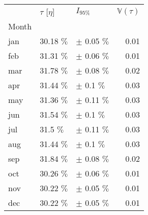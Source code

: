\begin{tabular}{lllr}
\toprule
{} & $\tau$ [$\eta$] &       $I_{95\%}$ &  $\mathbb{V}(\tau)$ \\
Month &                 &                  &                     \\
\midrule
jan   &      30.18 $\%$ &  $\pm$ 0.05 $\%$ &                0.01 \\
feb   &      31.31 $\%$ &  $\pm$ 0.06 $\%$ &                0.01 \\
mar   &      31.78 $\%$ &  $\pm$ 0.08 $\%$ &                0.02 \\
apr   &      31.44 $\%$ &   $\pm$ 0.1 $\%$ &                0.03 \\
may   &      31.36 $\%$ &  $\pm$ 0.11 $\%$ &                0.03 \\
jun   &      31.54 $\%$ &   $\pm$ 0.1 $\%$ &                0.03 \\
jul   &       31.5 $\%$ &  $\pm$ 0.11 $\%$ &                0.03 \\
aug   &      31.44 $\%$ &   $\pm$ 0.1 $\%$ &                0.03 \\
sep   &      31.84 $\%$ &  $\pm$ 0.08 $\%$ &                0.02 \\
oct   &      30.26 $\%$ &  $\pm$ 0.06 $\%$ &                0.01 \\
nov   &      30.22 $\%$ &  $\pm$ 0.05 $\%$ &                0.01 \\
dec   &      30.22 $\%$ &  $\pm$ 0.05 $\%$ &                0.01 \\
\bottomrule
\end{tabular}
